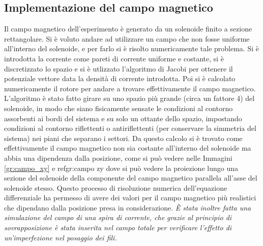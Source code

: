 \subsection{Implementazione del campo magnetico}
Il campo magnetico dell'esperimento è generato da un solenoide finito a sezione rettangolare. Si è voluto andare ad utilizzare un campo che non fosse uniforme all'interno
del solenoide, e per farlo si è risolto numericamente tale problema. Si è introdotta la corrente come pareti di corrente uniforme e costante, si è discretizzato lo spazio
e si è utlizzato l'algoritmo di Jacobi per ottenere il potenziale vettore data la densità di corrente introdotta. Poi si è calcolato numericamente il rotore per
andare a trovare effettivamente il campo magnetico. L'algoritmo è stato fatto girare su uno spazio più grande (circa un fattore 4) del solenoide, in modo che siano
fisicamente sensate le condizioni al contorno assorbenti ai bordi del sistema e su solo un ottante dello spazio, impostando condizioni al contorno riflettenti o antiriflettenti (per conservare la simmetria del sistema) nei piani che separano i settori. Da questo calcolo si è trovato come effettivamente il campo magnetico non sia costante
all'interno del solenoide ma abbia una dipendenza dalla posizione, come si può vedere nelle Immagini \ref{gr:campo_xy} e ref{gr:campo zy} dove si può vedere la proiezione lungo una
sezione del solenoide della componente del campo magnetico parallela all'asse del solenoide stesso. Questo processo di risoluzione numerica dell'equazione differenziale
ha permesso di avere dei valori per il campo magnetico più realistici che dipendano dalla posizione presa in considerazione.
\textit{\`E stata inoltre fatta una simulazione del campo di una spira di corrente, che grazie al principio di sovrapposizione \`e stata inserita nel campo totale per verificare l'effetto di un'imperfezione nel posaggio dei fili.}

